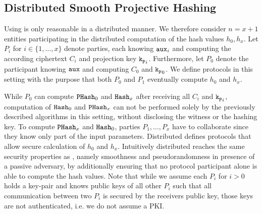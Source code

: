 \subsection{Distributed Smooth Projective Hashing}\label{sec:dsphf}
Using \SPHFF is only reasonable in a distributed manner.
We therefore consider $n=x+1$ entities participating in the distributed computation of the \SPHFF hash values $h_0,h_x$.
Let $P_i$ for $i\in\{1,\dots,x\}$ denote parties, each knowing $\mathtt{aux}_i$ and computing the according ciphertext $C_i$ and projection key $\mathtt{k_p}_i$.
Furthermore, let $P_0$ denote the participant knowing $\mathtt{aux}$ and computing $C_0$ and $\mathtt{k_p}_0$.
We define protocols in this setting with the purpose that both $P_0$ and $P_1$ eventually compute $h_0$ and $h_x$.

While $P_0$ can compute $\mathtt{PHash}_0$ and $\mathtt{Hash}_x$ after receiving all $C_i$ and $\mathtt{k_p}_i$, computation of $\mathtt{Hash}_0$ and $\mathtt{PHash}_x$ can not be performed solely by the previously described algorithms in this setting, without disclosing the witness or the hashing key.
To compute $\mathtt{PHash}_x$ and $\mathtt{Hash}_0$, parties $P_1,\dots,P_x$ have to collaborate since they know only part of the input parameters.
Distributed \SPHFF defines protocols that allow secure calculation of $h_0$ and $h_x$.
Intuitively distributed \SPHFF reaches the same security properties as \SPHFF, namely smoothness and pseudorandomness in presence of a passive adversary, by additionally ensuring that no protocol participant alone is able to compute the hash values.
Note that while we assume each $P_i$ for $i>0$ holds a key-pair and knows public keys of all other $P_i$ such that all communication between two $P_i$ is secured by the receivers public key, those keys are not authenticated, i.e. we do not assume a PKI.

